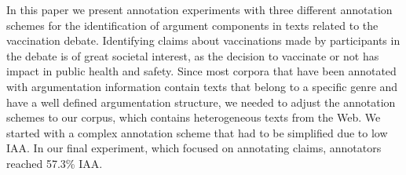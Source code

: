 In this paper we present annotation experiments with three different annotation schemes  for the identification of argument components in texts related to the vaccination debate. Identifying claims about vaccinations made by participants in the debate is of great societal interest, as the decision to vaccinate or not has impact in public health and safety. Since most corpora that have been annotated with argumentation information contain texts that belong to a specific genre and have a well defined argumentation structure, we needed to adjust the annotation schemes to  our corpus, which contains  heterogeneous texts from the Web. We started with a complex annotation scheme that had to be simplified due to low IAA. In our final experiment, which focused on  annotating claims,  annotators reached 57.3\% IAA.

